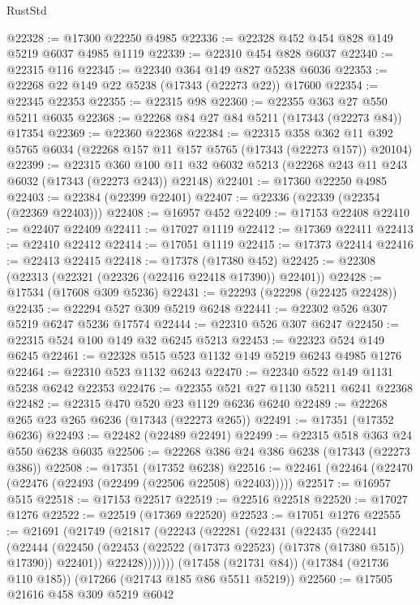 \begin{lexlean}{RustStd}
\begin{coremodule}
@22328 := @17300 @22250 @4985
@22336 := @22328 @452 @454 @828 @149 @5219 @6037 @4985 @1119
@22339 := @22310 @454 @828 @6037
@22340 := @22315 @116
@22345 := @22340 @364 @149 @827 @5238 @6036
@22353 := @22268 @22 @149 @22 @5238 (@17343 (@22273 @22)) @17600
@22354 := @22345 @22353
@22355 := @22315 @98
@22360 := @22355 @363 @27 @550 @5211 @6035
@22368 := @22268 @84 @27 @84 @5211 (@17343 (@22273 @84)) @17354
@22369 := @22360 @22368
@22384 := @22315
    @358
    @362
    @11
    @392
    @5765
    @6034
    (@22268 @157 @11 @157 @5765 (@17343 (@22273 @157)) @20104)
@22399 := @22315
    @360
    @100
    @11
    @32
    @6032
    @5213
    (@22268 @243 @11 @243 @6032 (@17343 (@22273 @243)) @22148)
@22401 := @17360 @22250 @4985
@22403 := @22384 (@22399 @22401)
@22407 := @22336 (@22339 (@22354 (@22369 @22403)))
@22408 := @16957 @452
@22409 := @17153 @22408
@22410 := @22407 @22409
@22411 := @17027 @1119
@22412 := @17369 @22411
@22413 := @22410 @22412
@22414 := @17051 @1119
@22415 := @17373 @22414
@22416 := @22413 @22415
@22418 := @17378 (@17380 @452)
@22425 := @22308 (@22313 (@22321 (@22326 (@22416 @22418 @17390)) @22401))
@22428 := @17534 (@17608 @309 @5236)
@22431 := @22293 (@22298 (@22425 @22428))
@22435 := @22294 @527 @309 @5219 @6248
@22441 := @22302 @526 @307 @5219 @6247 @5236 @17574
@22444 := @22310 @526 @307 @6247
@22450 := @22315 @524 @100 @149 @32 @6245 @5213
@22453 := @22323 @524 @149 @6245
@22461 := @22328 @515 @523 @1132 @149 @5219 @6243 @4985 @1276
@22464 := @22310 @523 @1132 @6243
@22470 := @22340 @522 @149 @1131 @5238 @6242 @22353
@22476 := @22355 @521 @27 @1130 @5211 @6241 @22368
@22482 := @22315 @470 @520 @23 @1129 @6236 @6240
@22489 := @22268 @265 @23 @265 @6236 (@17343 (@22273 @265))
@22491 := @17351 (@17352 @6236)
@22493 := @22482 (@22489 @22491)
@22499 := @22315 @518 @363 @24 @550 @6238 @6035
@22506 := @22268 @386 @24 @386 @6238 (@17343 (@22273 @386))
@22508 := @17351 (@17352 @6238)
@22516 := @22461 (@22464 (@22470 (@22476 (@22493 (@22499 (@22506 @22508) @22403)))))
@22517 := @16957 @515
@22518 := @17153 @22517
@22519 := @22516 @22518
@22520 := @17027 @1276
@22522 := @22519 (@17369 @22520)
@22523 := @17051 @1276
@22555 := @21691
    (@21749
      (@21817
        (@22243
          (@22281
            (@22431
              (@22435
                (@22441
                  (@22444
                    (@22450 (@22453 (@22522 (@17373 @22523) (@17378 (@17380 @515)) @17390)) @22401))
                  @22428)))))))
    (@17458 (@21731 @84))
    (@17384 (@21736 @110 @185))
    (@17266 (@21743 @185 @86 @5511 @5219))
@22560 := @17505 @21616 @458 @309 @5219 @6042

\end{coremodule}
\end{lexlean}
